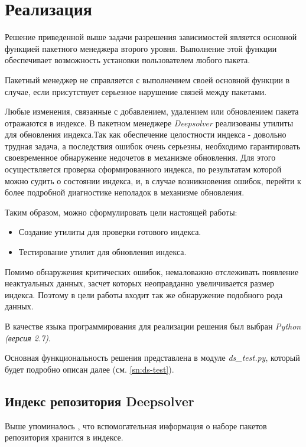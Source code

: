 \section{Реализация}
Решение приведенной выше задачи разрешения зависимостей является основной
функцией пакетного менеджера второго уровня. Выполнение этой функции обеспечивает
возможность установки пользователем любого пакета.

Пакетный менеджер не справляется с выполнением своей основной функции в случае,
если присутствует серьезное нарушение связей между пакетами. 

Любые изменения, связанные с добавлением, удалением или обновлением пакета отражаются в индексе.
В пакетном менеджере \textit{Deepsolver} реализованы утилиты для обновления индекса.Так как обеспечение целостности индекса - довольно трудная задача, а 
последствия ошибок очень серьезны, необходимо гарантировать своевременное
обнаружение недочетов в механизме обновления. Для этого осуществляется
проверка сформированного индекса, по результатам которой можно
судить о состоянии индекса, и, в случае возникновения ошибок, перейти
к более подробной диагностике неполадок в механизме обновления. 

Таким образом, можно сформулировать цели настоящей работы:
\begin{itemize}
\item{Создание утилиты для проверки готового индекса.}
\item{Тестирование утилит для обновления индекса.}
\end{itemize}

Помимо обнаружения критических ошибок, немаловажно отслеживать 
появление неактуальных данных, засчет которых неоправданно 
увеличивается размер индекса. Поэтому в цели работы входит
так же обнаружение подобного рода данных.

В качестве языка программирования для реализации решения был выбран \textit{Python (версия 2.7)}.

Основная функциональность решения представлена в модуле \textit{ds\_test.py}, который
будет подробно описан далее (см. \ref{sn:ds-test}).%

\subsection{Индекс репозитория Deepsolver}
Выше упоминалось , что вспомогательная информация о наборе пакетов репозитория
хранится в индексе. 

